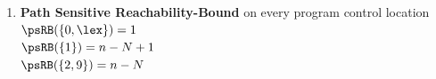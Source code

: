 \begin{enumerate}
\begin{itemize}
    $\inoutB(\tpath_3) = N^2$ \\
    $\inoutB(\tpath_0) = 1$ \\
    $\inoutB(\tpath_6) = 1$ 
\end{itemize}
\item \textbf{Path Sensitive Reachability-Bound} on every program control location
\\
$\psRB(\{0, \lex\}) = 1$ \\
$\psRB(\{1\}) = n - N + 1$ \\
$\psRB(\{2, 9\}) = n - N$ \\
\end{enumerate}